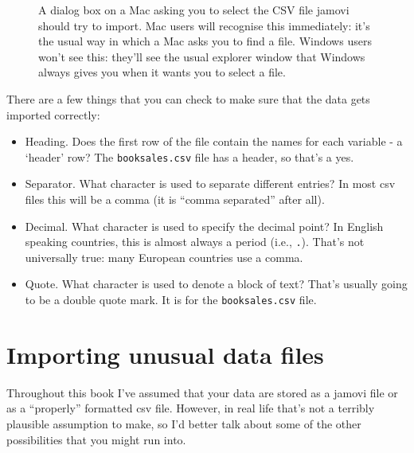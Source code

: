 \begin{figure}[t]
\begin{center}
\caption{A dialog box on a Mac asking you to select the CSV file jamovi should try to import. Mac users will recognise this immediately: it's the usual way in which a Mac asks you to find a file. Windows users won't see this: they'll see the usual explorer window that Windows always gives you when it wants you to select a file.}
\HR
\label{fig:fileopen}
\end{center}
\end{figure} 

There are a few things that you can check to make sure that the data gets imported correctly: 

\begin{itemize}
\item Heading. Does the first row of the file contain the names for each variable - a `header' row? The \texttt{booksales.csv} file has a header, so that's a yes.
\item Separator. What character is used to separate different entries? In most csv files this will be a comma (it is ``comma separated'' after all).
\item Decimal. What character is used to specify the decimal point? In English speaking countries, this is almost always a period (i.e., \texttt{.}). That's not universally true: many European countries use a comma. 
\item Quote. What character is used to denote a block of text? That's usually going to be a double quote mark. It is for the \texttt{booksales.csv} file.
\end{itemize}


\section{Importing unusual data files~\label{sec:importing}}

Throughout this book I've assumed that your data are stored as a jamovi  file or as a ``properly'' formatted csv file. However, in real life that's not a terribly plausible assumption to make, so I'd better talk about some of the other possibilities that you might run into. 



